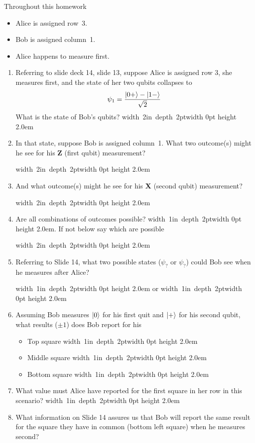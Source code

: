 \documentclass[12pt]{article}
\newcommand{\Blank}[1][1in]{\mbox{\hskip 4pt\vrule width #1 depth 2pt}\vrule width 0pt height 2.0em}
\begin{document}
Throughout this homework
\begin{itemize}
    \item Alice is assigned row~3.
    \item Bob is assigned column~1.  
    \item Alice happens to measure first.
    \end{itemize}
\begin{enumerate}[font=\bfseries]
    \item Referring to slide deck 14, slide 13, suppose Alice is assigned row 3, she measures first, and the state of her two qubits collapses to \[ \psi_{1}=\frac{\ket{0+}-\ket{1-}}{\sqrt{2}} \]
    What is the state of Bob's qubits? \Blank[2in]
    \clearpage
    \item In that state, suppose Bob is assigned column~1.  What two outcome(s) might he see for his \textbf{Z} (first qubit) measurement?
    
    \Blank[2in]
    \item And what outcome(s) might he see for his \textbf{X} (second qubit) measurement?
    
    \Blank[2in]
    
    \item Are all combinations of outcomes possible?  \Blank{}.  If not below say which are possible
    
    \Blank[2in]{}
    \item Referring to Slide 14, what two possible states ($\psi_{?}$ or $\psi_{?}$) could Bob see when he measures after Alice?
    
    \Blank{} or \Blank{}
    \item Assuming Bob measures $\ket{0}$ for his first quit and $\ket{+}$ for his second qubit, what results ($\pm 1$) does Bob report for his
    \begin{itemize}
        \item Top square \Blank{}
        \item Middle square \Blank{}
        \item Bottom square \Blank{}
    \end{itemize}
    \item What value must Alice have reported for the first square in her row in this scenario? \Blank{}
    \clearpage
    \item What information on Slide 14 assures us that Bob will report the same result for the square they have in common (bottom left square) when he measures second?
    
\end{enumerate}
\end{document}
